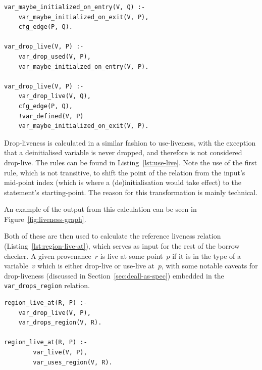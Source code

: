 \documentclass[11pt,a4paper,twoside,openany]{report}
\newenvironment{sourcecode}{\captionsetup{type=listing}}{}
\newcommand{\InDatalog}[1]{\texttt{#1}}
\begin{document}
\begin{sourcecode}
  \label{lst:use-live}
\begin{verbatim}
var_maybe_initialized_on_entry(V, Q) :-
    var_maybe_initialized_on_exit(V, P),
    cfg_edge(P, Q).

var_drop_live(V, P) :-
    var_drop_used(V, P),
    var_maybe_initialzed_on_entry(V, P).

var_drop_live(V, P) :-
    var_drop_live(V, Q),
    cfg_edge(P, Q),
    !var_defined(V, P)
    var_maybe_initialized_on_exit(V, P).
\end{verbatim}
\end{sourcecode}

Drop-liveness is calculated in a similar fashion to use-liveness, with the
exception that a deinitialised variable is never dropped, and therefore is not
considered drop-live. The rules can be found in Listing~\ref{lst:use-live}. Note
the use of the first rule, which is not transitive, to shift the point of the
relation from the input's mid-point index (which is where a (de)initialisation
would take effect) to the statement's starting-point. The reason for this
transformation is mainly technical.

An example of the output from this calculation can be seen in
Figure~\ref{fig:liveness-graph}.

Both of these are then used to calculate the reference liveness relation
(Listing~\ref{lst:region-live-at}), which serves as input for the rest of the
borrow checker. A given provenance~$r$ is live at some point~$p$ if it is in the
type of a variable~$v$ which is either drop-live or use-live at~$p$, with some
notable caveats for drop-liveness (discussed in Section~\ref{sec:deall-as-spec})
embedded in the \InDatalog{var_drops_region} relation.

\begin{sourcecode}
  \label{lst:region-live-at}
\begin{verbatim}
region_live_at(R, P) :-
    var_drop_live(V, P),
    var_drops_region(V, R).
        
region_live_at(R, P) :-
        var_live(V, P),
        var_uses_region(V, R).
\end{verbatim}
\end{sourcecode}
\end{document}
